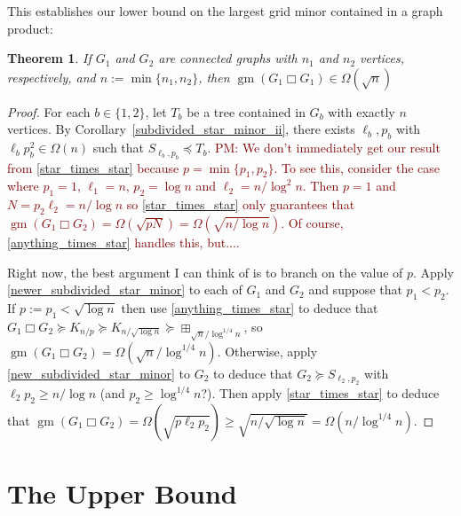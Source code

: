 \documentclass[lotsofwhite]{patmorin}
\newcommand{\boxprod}{\mathbin{\Box}}
\renewcommand{\ge}{\geqslant}
\DeclareMathOperator{\gm}{gm}
\newcommand{\pat}[1]{\textcolor{Maroon}{PM: #1}}
\theoremstyle{plain}
\newtheorem{thm}{Theorem}
\theoremstyle{definition}
\begin{document}
This establishes our lower bound on the largest grid minor contained in a graph product:

\begin{thm}\label{lower_bound}
  If $G_1$ and $G_2$ are connected graphs with $n_1$ and $n_2$ vertices, respectively, and $n:=\min\{n_1,n_2\}$, then $\gm(G_1\boxprod G_1)\in\Omega(\sqrt{n})$
\end{thm}

\begin{proof}
  For each $b\in\{1,2\}$, let $T_b$ be a tree contained in $G_b$ with exactly $n$ vertices.  By Corollary~\ref{subdivided_star_minor_ii}, there exists $\ell_b,p_b$ with $\ell_b p_b^2\in\Omega(n)$ such that $S_{\ell_b,p_b}\preceq T_b$. \pat{We don't immediately get our result from \cref{star_times_star} because $p=\min\{p_1,p_2\}$.  To see this, consider the case where $p_1=1$, $\ell_1=n$, $p_2=\log n$ and $\ell_2=n/\log^2 n$.  Then $p=1$ and $N=p_2\ell_2=n/\log n$ so \cref{star_times_star} only guarantees that $\gm(G_1\boxprod G_2)=\Omega(\sqrt{p N})=\Omega(\sqrt{n/\log n})$.  Of course, \cref{anything_times_star} handles this, but....}

  Right now, the best argument I can think of is to branch on the value of $p$.  Apply \cref{newer_subdivided_star_minor} to each of $G_1$ and $G_2$ and suppose that $p_1< p_2$.  If $p:=p_1 < \sqrt{\log n}$ then use \cref{anything_times_star} to deduce that $G_1\boxprod G_2\succeq K_{n/p}\succeq K_{n/\sqrt{\log n}}\succeq \boxplus_{\sqrt{n}/\log^{1/4} n}$, so $\gm(G_1\boxprod G_2)=\Omega(\sqrt{n}/\log^{1/4} n)$.  Otherwise, apply \cref{new_subdivided_star_minor} to $G_2$ to deduce that $G_2\succeq S_{\ell_2,p_2}$ with $\ell_2p_2 \ge n/\log n$ (and $p_2\ge \log^{1/4} n$?).  Then apply \cref{star_times_star} to deduce that $\gm(G_1\boxprod G_2)=\Omega(\sqrt{p\ell_2p_2}) \ge \sqrt{n/\sqrt{\log n}}=\Omega(n/\log^{1/4} n)$.

\end{proof}

\section{The Upper Bound}
\end{document}

